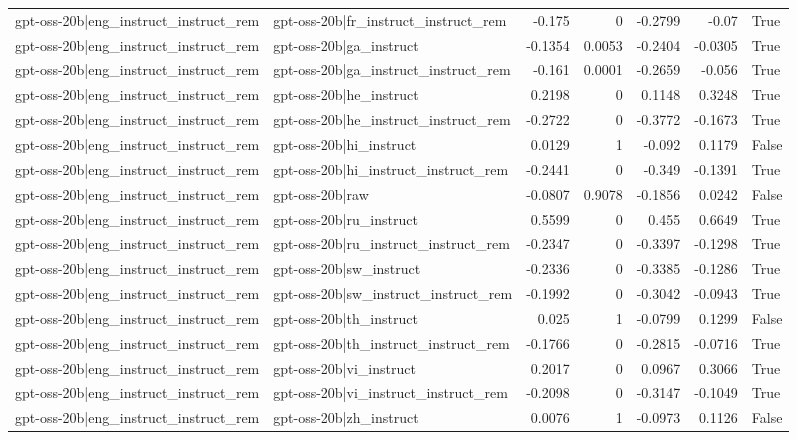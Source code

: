 \begin{table}
\begin{tabular}{l l r r r r l}
gpt-oss-20b|eng_instruct_instruct_rem & gpt-oss-20b|fr_instruct_instruct_rem & -0.175 & 0 & -0.2799 & -0.07 & True \\
gpt-oss-20b|eng_instruct_instruct_rem & gpt-oss-20b|ga_instruct & -0.1354 & 0.0053 & -0.2404 & -0.0305 & True \\
gpt-oss-20b|eng_instruct_instruct_rem & gpt-oss-20b|ga_instruct_instruct_rem & -0.161 & 0.0001 & -0.2659 & -0.056 & True \\
gpt-oss-20b|eng_instruct_instruct_rem & gpt-oss-20b|he_instruct & 0.2198 & 0 & 0.1148 & 0.3248 & True \\
gpt-oss-20b|eng_instruct_instruct_rem & gpt-oss-20b|he_instruct_instruct_rem & -0.2722 & 0 & -0.3772 & -0.1673 & True \\
gpt-oss-20b|eng_instruct_instruct_rem & gpt-oss-20b|hi_instruct & 0.0129 & 1 & -0.092 & 0.1179 & False \\
gpt-oss-20b|eng_instruct_instruct_rem & gpt-oss-20b|hi_instruct_instruct_rem & -0.2441 & 0 & -0.349 & -0.1391 & True \\
gpt-oss-20b|eng_instruct_instruct_rem & gpt-oss-20b|raw & -0.0807 & 0.9078 & -0.1856 & 0.0242 & False \\
gpt-oss-20b|eng_instruct_instruct_rem & gpt-oss-20b|ru_instruct & 0.5599 & 0 & 0.455 & 0.6649 & True \\
gpt-oss-20b|eng_instruct_instruct_rem & gpt-oss-20b|ru_instruct_instruct_rem & -0.2347 & 0 & -0.3397 & -0.1298 & True \\
gpt-oss-20b|eng_instruct_instruct_rem & gpt-oss-20b|sw_instruct & -0.2336 & 0 & -0.3385 & -0.1286 & True \\
gpt-oss-20b|eng_instruct_instruct_rem & gpt-oss-20b|sw_instruct_instruct_rem & -0.1992 & 0 & -0.3042 & -0.0943 & True \\
gpt-oss-20b|eng_instruct_instruct_rem & gpt-oss-20b|th_instruct & 0.025 & 1 & -0.0799 & 0.1299 & False \\
gpt-oss-20b|eng_instruct_instruct_rem & gpt-oss-20b|th_instruct_instruct_rem & -0.1766 & 0 & -0.2815 & -0.0716 & True \\
gpt-oss-20b|eng_instruct_instruct_rem & gpt-oss-20b|vi_instruct & 0.2017 & 0 & 0.0967 & 0.3066 & True \\
gpt-oss-20b|eng_instruct_instruct_rem & gpt-oss-20b|vi_instruct_instruct_rem & -0.2098 & 0 & -0.3147 & -0.1049 & True \\
gpt-oss-20b|eng_instruct_instruct_rem & gpt-oss-20b|zh_instruct & 0.0076 & 1 & -0.0973 & 0.1126 & False \\

\end{tabular}
\end{table}
